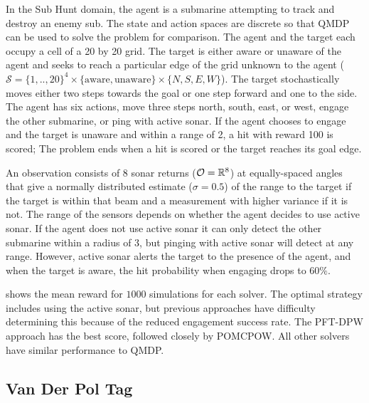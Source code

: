 In the Sub Hunt domain, the agent is a submarine attempting to track and destroy an enemy sub.
The state and action spaces are discrete so that QMDP can be used to solve the problem for comparison.
The agent and the target each occupy a cell of a 20 by 20 grid. The target is either aware or unaware of the agent and seeks to reach a particular edge of the grid unknown to the agent ($\mathcal{S} = \{1,..,20\}^4 \times \{\text{aware}, \text{unaware}\} \times \{N,S,E,W\}$).
The target stochastically moves either two steps towards the goal or one step forward and one to the side.
The agent has six actions, move three steps north, south, east, or west, engage the other submarine, or ping with active sonar.
If the agent chooses to engage and the target is unaware and within a range of 2, a hit with reward 100 is scored; The problem ends when a hit is scored or the target reaches its goal edge.

An observation consists of 8 sonar returns ($\mathcal{O} = \mathbb{R}^8$) at equally-spaced angles that give a normally distributed estimate ($\sigma=0.5$) of the range to the target if the target is within that beam and a measurement with higher variance if it is not.
The range of the sensors depends on whether the agent decides to use active sonar.
If the agent does not use active sonar it can only detect the other submarine within a radius of 3, but pinging with active sonar will detect at any range.
However, active sonar alerts the target to the presence of the agent, and when the target is aware, the hit probability when engaging drops to $60\%$.

 shows the mean reward for $1000$ simulations for each solver.
The optimal strategy includes using the active sonar, but previous approaches have difficulty determining this because of the reduced engagement success rate.
The PFT-DPW approach has the best score, followed closely by POMCPOW.
All other solvers have similar performance to QMDP.


\subsection{Van Der Pol Tag} \label{sec:vdptag}

